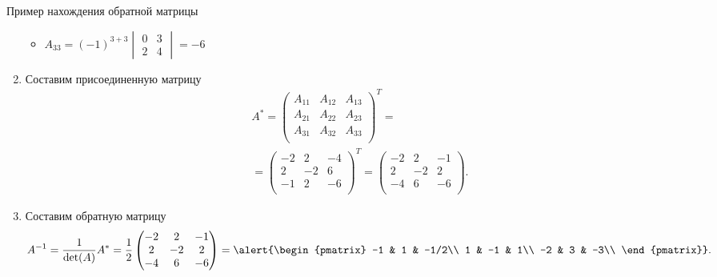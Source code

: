 \documentclass[unicode,11pt,notheorems]{beamer}
\begin{document}
\begin{frame}{Пример нахождения обратной матрицы}{}
\begin{enumerate}
\begin{itemize}
\item
	$A_{33} = (-1)^{3+3} \begin{vmatrix} 0 & 3 \\ 2 & 4\end{vmatrix} = -6$
	\hfill
\end{itemize}

\framebreak	
\item 
	Составим присоединенную  матрицу
	\begin{multline*}
		A^*= \begin{pmatrix}
			A_{11} & A_{12} & A_{13}\\
			A_{21} & A_{22} & A_{23}\\
			A_{31} & A_{32} & A_{33}\\
		\end{pmatrix}^T 
		=\\
		= \begin{pmatrix}
			-2 & 2 & -4\\
			2 & -2 & 6\\
			-1 & 2 & -6\\
		\end{pmatrix}^T
		=
		\begin{pmatrix}
			-2 & 2 & -1\\
			2 & -2 & 2\\
			-4 & 6 & -6\\
		\end{pmatrix}.
	\end{multline*}

\item 
Составим обратную матрицу
$$
	A^{-1}=\frac{1}{\det(A)}A^*= 
	\frac{1}{2}
	\begin{pmatrix}
	-2 & 2 & -1\\
	2 & -2 & 2\\
	-4 & 6 & -6\\
	\end{pmatrix} = 
	\alert{\begin{pmatrix}
	-1 & 1 & -1/2\\
	1 & -1 & 1\\
	-2 & 3 & -3\\
	\end{pmatrix}}.
$$


\end{enumerate}
\end{frame}
\end{document}
